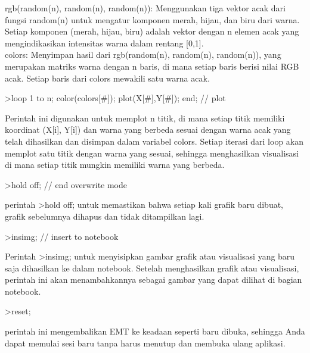 \documentclass{article}
\begin{document}
\begin{eulernotebook}
\begin{eulercomment}
rgb(random(n), random(n), random(n)): Menggunakan tiga vektor acak
dari fungsi random(n) untuk mengatur komponen merah, hijau, dan biru
dari warna. Setiap komponen (merah, hijau, biru) adalah vektor dengan
n elemen acak yang mengindikasikan intensitas warna dalam rentang
[0,1].\\
colors: Menyimpan hasil dari rgb(random(n), random(n), random(n)),
yang merupakan matriks warna dengan n baris, di mana setiap baris
berisi nilai RGB acak. Setiap baris dari colors mewakili satu warna
acak.
\end{eulercomment}
\begin{eulerprompt}
>loop 1 to n; color(colors[#]); plot(X[#],Y[#]); end; // plot
\end{eulerprompt}
\begin{eulercomment}
Perintah ini digunakan untuk memplot n titik, di mana setiap titik
memiliki koordinat (X[i], Y[i]) dan warna yang berbeda sesuai dengan
warna acak yang telah dihasilkan dan disimpan dalam variabel colors.
Setiap iterasi dari loop akan memplot satu titik dengan warna yang
sesuai, sehingga menghasilkan visualisasi di mana setiap titik mungkin
memiliki warna yang berbeda.
\end{eulercomment}
\begin{eulerprompt}
>hold off; // end overwrite mode
\end{eulerprompt}
\begin{eulercomment}
perintah \textgreater{}hold off; untuk memastikan bahwa setiap kali grafik baru
dibuat, grafik sebelumnya dihapus dan tidak ditampilkan lagi.
\end{eulercomment}
\begin{eulerprompt}
>insimg; // insert to notebook
\end{eulerprompt}
\begin{eulercomment}
Perintah \textgreater{}insimg; untuk menyisipkan gambar grafik atau visualisasi
yang baru saja dihasilkan ke dalam notebook. Setelah menghasilkan
grafik atau visualisasi, perintah ini akan menambahkannya sebagai
gambar yang dapat dilihat di bagian notebook.
\end{eulercomment}
\begin{eulerprompt}
>reset;
\end{eulerprompt}
\begin{eulercomment}
perintah ini mengembalikan EMT ke keadaan seperti baru dibuka,
sehingga Anda dapat memulai sesi baru tanpa harus menutup dan membuka
ulang aplikasi. 


\end{eulercomment}
\end{eulernotebook}
\end{document}
